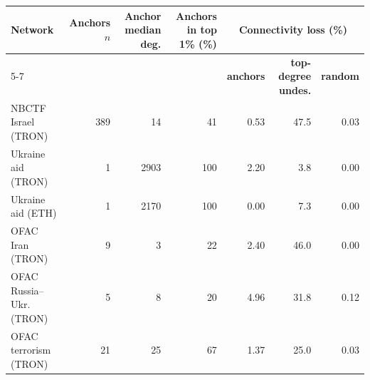 \begin{tabular}{lrrrrrr}
\toprule
\textbf{Network} & \textbf{Anchors $n$} & \textbf{Anchor median deg.} & \textbf{Anchors in top 1\% (\%)} & \multicolumn{3}{c}{\textbf{Connectivity loss (\%)}} \\
\cmidrule(lr){5-7}
 & & & & \textbf{anchors} & \textbf{top-degree undes.} & \textbf{random} \\
\midrule
NBCTF Israel (TRON) & 389 & 14 & 41 & 0.53 & 47.5 & 0.03 \\
Ukraine aid (TRON) & 1 & 2903 & 100 & 2.20 & 3.8 & 0.00 \\
Ukraine aid (ETH) & 1 & 2170 & 100 & 0.00 & 7.3 & 0.00 \\
OFAC Iran (TRON) & 9 & 3 & 22 & 2.40 & 46.0 & 0.00 \\
OFAC Russia--Ukr. (TRON) & 5 & 8 & 20 & 4.96 & 31.8 & 0.12 \\
OFAC terrorism (TRON) & 21 & 25 & 67 & 1.37 & 25.0 & 0.03 \\
\bottomrule
\end{tabular}
